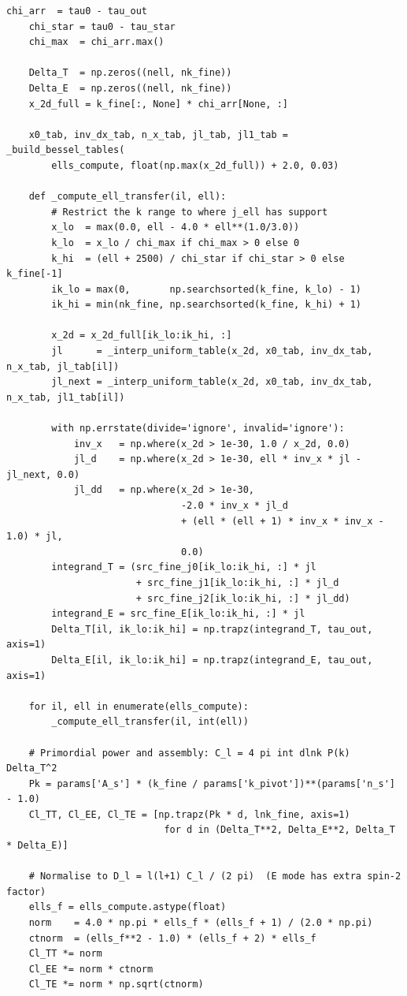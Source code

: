 \begin{codebox}
\begin{lstlisting}[style=python]
    chi_arr  = tau0 - tau_out
    chi_star = tau0 - tau_star
    chi_max  = chi_arr.max()

    Delta_T  = np.zeros((nell, nk_fine))
    Delta_E  = np.zeros((nell, nk_fine))
    x_2d_full = k_fine[:, None] * chi_arr[None, :]

    x0_tab, inv_dx_tab, n_x_tab, jl_tab, jl1_tab = _build_bessel_tables(
        ells_compute, float(np.max(x_2d_full)) + 2.0, 0.03)

    def _compute_ell_transfer(il, ell):
        # Restrict the k range to where j_ell has support
        x_lo  = max(0.0, ell - 4.0 * ell**(1.0/3.0))
        k_lo  = x_lo / chi_max if chi_max > 0 else 0
        k_hi  = (ell + 2500) / chi_star if chi_star > 0 else k_fine[-1]
        ik_lo = max(0,       np.searchsorted(k_fine, k_lo) - 1)
        ik_hi = min(nk_fine, np.searchsorted(k_fine, k_hi) + 1)

        x_2d = x_2d_full[ik_lo:ik_hi, :]
        jl      = _interp_uniform_table(x_2d, x0_tab, inv_dx_tab, n_x_tab, jl_tab[il])
        jl_next = _interp_uniform_table(x_2d, x0_tab, inv_dx_tab, n_x_tab, jl1_tab[il])

        with np.errstate(divide='ignore', invalid='ignore'):
            inv_x   = np.where(x_2d > 1e-30, 1.0 / x_2d, 0.0)
            jl_d    = np.where(x_2d > 1e-30, ell * inv_x * jl - jl_next, 0.0)
            jl_dd   = np.where(x_2d > 1e-30,
                               -2.0 * inv_x * jl_d
                               + (ell * (ell + 1) * inv_x * inv_x - 1.0) * jl,
                               0.0)
        integrand_T = (src_fine_j0[ik_lo:ik_hi, :] * jl
                       + src_fine_j1[ik_lo:ik_hi, :] * jl_d
                       + src_fine_j2[ik_lo:ik_hi, :] * jl_dd)
        integrand_E = src_fine_E[ik_lo:ik_hi, :] * jl
        Delta_T[il, ik_lo:ik_hi] = np.trapz(integrand_T, tau_out, axis=1)
        Delta_E[il, ik_lo:ik_hi] = np.trapz(integrand_E, tau_out, axis=1)

    for il, ell in enumerate(ells_compute):
        _compute_ell_transfer(il, int(ell))

    # Primordial power and assembly: C_l = 4 pi int dlnk P(k) Delta_T^2
    Pk = params['A_s'] * (k_fine / params['k_pivot'])**(params['n_s'] - 1.0)
    Cl_TT, Cl_EE, Cl_TE = [np.trapz(Pk * d, lnk_fine, axis=1)
                            for d in (Delta_T**2, Delta_E**2, Delta_T * Delta_E)]

    # Normalise to D_l = l(l+1) C_l / (2 pi)  (E mode has extra spin-2 factor)
    ells_f = ells_compute.astype(float)
    norm    = 4.0 * np.pi * ells_f * (ells_f + 1) / (2.0 * np.pi)
    ctnorm  = (ells_f**2 - 1.0) * (ells_f + 2) * ells_f
    Cl_TT *= norm
    Cl_EE *= norm * ctnorm
    Cl_TE *= norm * np.sqrt(ctnorm)


\end{lstlisting}
\end{codebox}
